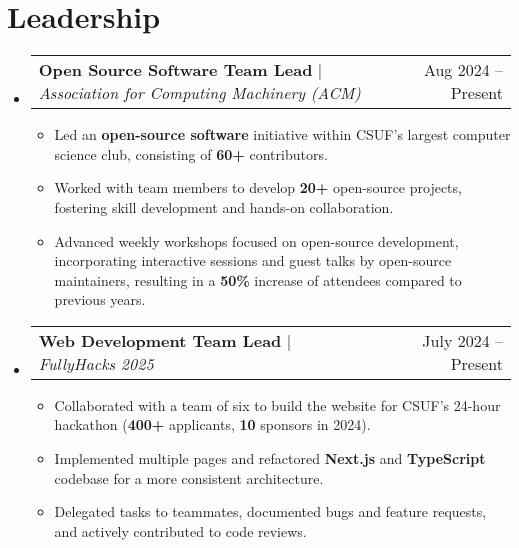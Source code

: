 \documentclass[letterpaper,11pt]{article}
\makeatletter
\newcommand{\resumeItem}[1]{
  \item\small{
    {#1 \vspace{-2pt}}
  }
}
\newcommand{\resumeProjectHeading}[2]{
  \item
  \begin{tabular*}{1\textwidth}{l@{\extracolsep{\fill}}r}
    \small#1 & #2 \\
  \end{tabular*}\vspace{-7pt}
}
\newcommand{\resumeSubHeadingListStart}{\begin{itemize}[leftmargin=0in, label={}]}
\newcommand{\resumeSubHeadingListEnd}{\end{itemize}}
\newcommand{\resumeItemListStart}{\begin{itemize}[leftmargin=0.25in]}
\newcommand{\resumeItemListEnd}{\end{itemize}\vspace{-5pt}}
\makeatother
\begin{document}
\section{Leadership}
\resumeSubHeadingListStart
\resumeProjectHeading
{\textbf{Open Source Software Team Lead} $|$
  \footnotesize\emph{Association for Computing Machinery (ACM)}}{Aug 2024 -- Present}
\resumeItemListStart
\resumeItem{Led an \textbf{open-source software} initiative within CSUF's largest computer science club, consisting of \textbf{60+} contributors.}
\resumeItem{Worked with team members to develop \textbf{20+} open-source projects, fostering skill development and hands-on collaboration.}
\resumeItem{Advanced weekly workshops focused on open-source development, incorporating interactive sessions and guest talks by open-source maintainers, resulting in a \textbf{50\%} increase of attendees compared to previous years.}
\resumeItemListEnd
\resumeProjectHeading
{\textbf{Web Development Team Lead} $|$
  \footnotesize\emph{FullyHacks 2025}}{July 2024 -- Present}
\resumeItemListStart
\resumeItem{Collaborated with a team of six to build the website for CSUF's 24-hour hackathon (\textbf{400+} applicants, \textbf{10} sponsors in 2024).}
\resumeItem{Implemented multiple pages and refactored \textbf{Next.js} and \textbf{TypeScript} codebase for a more consistent architecture.}
\resumeItem{Delegated tasks to teammates, documented bugs and feature requests, and actively contributed to code reviews.}
\resumeItemListEnd
\resumeSubHeadingListEnd
\end{document}
